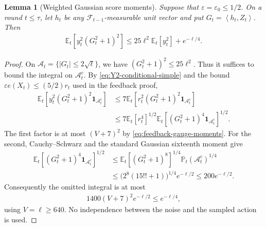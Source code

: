\documentclass[11pt]{article}
\newtheorem{lemma}[lemma]{Lemma}
\newcommand{\E}{\mathbb E}
\newcommand{\Pp}{\mathbb P}
\newcommand{\F}{\mathcal F}
\newcommand{\1}{\mathbf 1}
\newcommand{\eps}{\varepsilon}
\newcommand{\ip}[2]{\left\langle #1,#2\right\rangle}
\begin{document}
\begin{lemma}[Weighted Gaussian score moments]
    \label{lem:gaussian-score-localisation}
    Suppose that $\eps=\eps_0\leq1/2$. On a round $t\leq\tau$, let
    $h_t$ be any $\F_{t-1}$-measurable unit vector and put
    $G_t=\ip{h_t}{Z_t}$. Then
    \begin{align}
        \E_t[y_t^2(G_t^2+1)^2]
        \leq25\ell^2\E_t[y_t^2]+e^{-\ell/4}.
        \label{eq:H-score-second-moment}
    \end{align}
\end{lemma}
\begin{proof}
    On $\mathcal A_t=\{|G_t|\leq2\sqrt\ell\}$, we have
    $(G_t^2+1)^2\leq25\ell^2$. Thus it suffices to bound the integral on
    $\mathcal A_t^c$. By \eqref{eq:Y2-conditional-simple} and the bound
    $\eps e(X_t)\leq(5/2)r_t$ used in the feedback proof,
    \begin{align}
        \E_t[y_t^2(G_t^2+1)^2\1_{\mathcal A_t^c}]
         & \leq7\E_t[r_t^2(G_t^2+1)^2\1_{\mathcal A_t^c}]
        \\
         & \leq7\E_t[r_t^4]^{1/2}
        \E_t[(G_t^2+1)^4\1_{\mathcal A_t^c}]^{1/2}.
    \end{align}
    The first factor is at most $(V+7)^2$ by
    \eqref{eq:feedback-gauge-moments}. For the second, Cauchy--Schwarz and
    the standard Gaussian sixteenth moment give
    \begin{align}
        \E_t[(G_t^2+1)^4\1_{\mathcal A_t^c}]^{1/2}
         & \leq\E_t[(G_t^2+1)^8]^{1/4}\Pp_t(\mathcal A_t^c)^{1/4}
        \\
         & \leq\bigl(2^8(15!!+1)\bigr)^{1/4}e^{-\ell/2}
        \leq200e^{-\ell/2}.
    \end{align}
    Consequently the omitted integral is at most
    \begin{align}
        1400(V+7)^2e^{-\ell/2}\leq e^{-\ell/4},
    \end{align}
    using $V=\ell\geq640$. No independence between the noise and the
    sampled action is used.
\end{proof}
\end{document}
